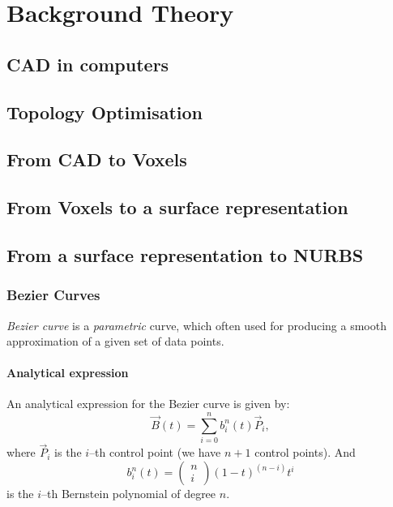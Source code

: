 \chapter{Background Theory}
\label{chapter:Background}

\section{CAD in computers}


\section{Topology Optimisation}

\section{From CAD to Voxels}

\section{From Voxels to a surface representation}

\section{From a surface representation to NURBS}
\subsection{Bezier Curves}
\emph{Bezier curve} is a \textit{parametric} curve, which often used for producing a smooth approximation of a given set of data points.
\subsubsection{Analytical expression} 
An analytical expression for the Bezier curve is given by:
\begin{equation*}
\vec{B}(t)=\sum\limits_{i=0}^n b_i^n(t) \vec{P}_i,
\end{equation*}
where $\vec{P}_i$ is the $i$--th control point (we have $n+1$ control points). And
\begin{equation*}
b_i^n(t)=\left(\begin{array}{c}n\\i\end{array}\right)(1-t)^{(n-i)}t^i
\end{equation*}
is the $i$--th Bernstein polynomial of degree $n$.

